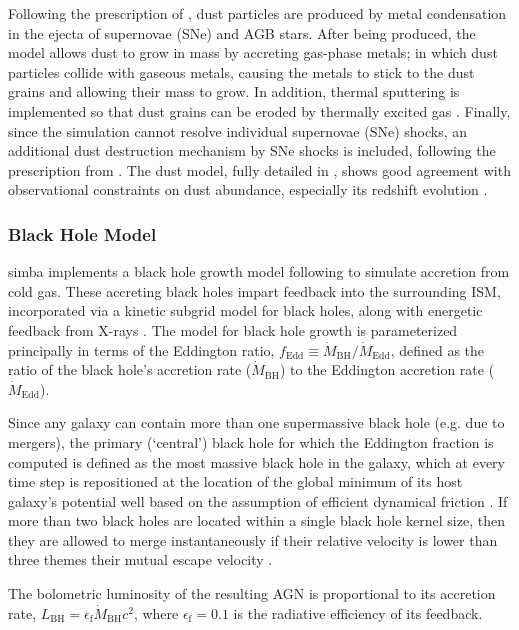 \documentclass[twocolumn, linenumbers]{aastex631}
\newcommand{\mbhd}{\dot{M}_{\text{BH}}}
\newcommand{\fedd}{f_{\text{Edd}}}
\newcommand{\simba}[0]{{\sc simba} }
\begin{document}
Following the prescription of \cite{dwek}, dust particles are produced by metal condensation in the ejecta of supernovae (SNe) and AGB stars.  After being produced, the model allows dust to grow in mass by accreting gas-phase metals; in which dust particles collide with gaseous metals, causing the metals to stick to the dust grains and allowing their mass to grow.  In addition, thermal sputtering is implemented so that dust grains can be eroded by thermally excited gas  \citep{simba}.  Finally, since the simulation cannot resolve individual supernovae (SNe) shocks, an additional dust destruction mechanism by SNe shocks is included, following the prescription from \cite{mckinnon}.  The dust model, fully detailed in \cite{Li2019}, shows good agreement with observational constraints on dust abundance, especially its redshift evolution \citep{parente2025}.

\subsubsection{Black Hole Model}
\label{ssec:bh}
\simba implements a black hole growth model following \cite{bhtorque} to simulate accretion from cold gas.  These accreting black holes impart feedback into the surrounding ISM, incorporated via a kinetic subgrid model for black holes, along with energetic feedback from X-rays \citep{simba}.  The model for black hole growth is parameterized principally in terms of the Eddington ratio, $\fedd\equiv \mbhd/\dot{M}_{\text{Edd}}$, defined as the ratio of the black hole's accretion rate ($\mbhd$) to the Eddington accretion rate ($\dot{M}_{\text{Edd}}$).  

Since any galaxy can contain more than one supermassive black hole (e.g. due to mergers), the primary (`central') black hole for which the Eddington fraction is computed is defined as the most massive black hole in the galaxy, which at every time step is repositioned at the location of the global minimum of its host galaxy's potential well based on the assumption of efficient dynamical friction \citep{simba}.  If more than two black holes are located within a single black hole kernel size, then they are allowed to merge instantaneously if their relative velocity is lower than three themes their mutual escape velocity \citep{simba}.  


The bolometric luminosity of the resulting AGN is proportional to its accretion rate, $L_{\text{BH}}=\epsilon_{\text{f}}\mbhd c^2$, where $\epsilon_\text{f}=0.1$ is the radiative efficiency of its feedback.
\end{document}
